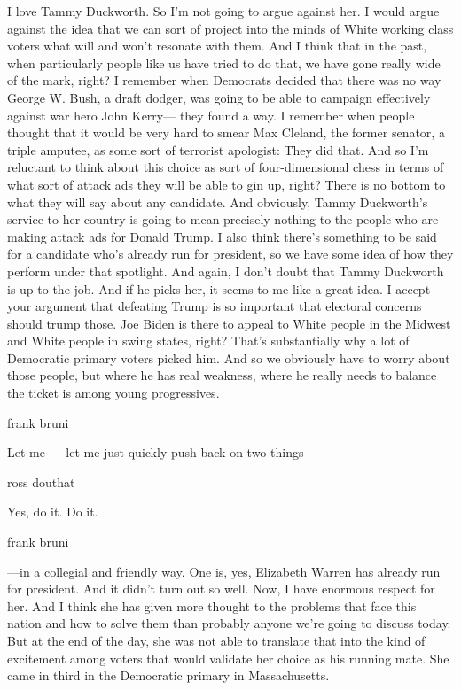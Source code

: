 I love Tammy Duckworth. So I'm not going to argue against her. I would
argue against the idea that we can sort of project into the minds of
White working class voters what will and won't resonate with them. And I
think that in the past, when particularly people like us have tried to
do that, we have gone really wide of the mark, right? I remember when
Democrats decided that there was no way George W. Bush, a draft dodger,
was going to be able to campaign effectively against war hero John
Kerry--- they found a way. I remember when people thought that it would
be very hard to smear Max Cleland, the former senator, a triple amputee,
as some sort of terrorist apologist: They did that. And so I'm reluctant
to think about this choice as sort of four-dimensional chess in terms of
what sort of attack ads they will be able to gin up, right? There is no
bottom to what they will say about any candidate. And obviously, Tammy
Duckworth's service to her country is going to mean precisely nothing to
the people who are making attack ads for Donald Trump. I also think
there's something to be said for a candidate who's already run for
president, so we have some idea of how they perform under that
spotlight. And again, I don't doubt that Tammy Duckworth is up to the
job. And if he picks her, it seems to me like a great idea. I accept
your argument that defeating Trump is so important that electoral
concerns should trump those. Joe Biden is there to appeal to White
people in the Midwest and White people in swing states, right? That's
substantially why a lot of Democratic primary voters picked him. And so
we obviously have to worry about those people, but where he has real
weakness, where he really needs to balance the ticket is among young
progressives.

frank bruni

Let me --- let me just quickly push back on two things ---

ross douthat

Yes, do it. Do it.

frank bruni

---in a collegial and friendly way. One is, yes, Elizabeth Warren has
already run for president. And it didn't turn out so well. Now, I have
enormous respect for her. And I think she has given more thought to the
problems that face this nation and how to solve them than probably
anyone we're going to discuss today. But at the end of the day, she was
not able to translate that into the kind of excitement among voters that
would validate her choice as his running mate. She came in third in the
Democratic primary in Massachusetts.


